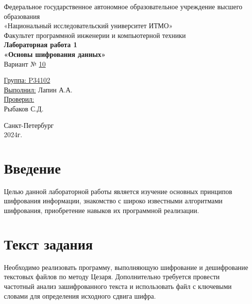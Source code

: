 \documentclass[a4paper, 14pt]{report}
\begin{document}
\begin{titlepage}
    \centering
    {\large Федеральное государственное автономное образовательное учреждение высшего образования}\\
    {\large «Национальный исследовательский университет ИТМО»}\\[0.5cm]

    {\large Факультет программной инженерии и компьютерной техники}\\[3cm]

    {\large \bfseries Лабораторная работа 1}\\[0.5cm]
    {\large \bfseries «Основы шифрования данных»}\\[1cm]

    {\large Вариант № \underline{10}}\\[5cm]
    \begin{flushright}
        {\large \underline{Группа: P34102}}\\[0.5cm]
        {\large \underline{Выполнил:} Лапин А.А.}\\[1cm]

        {\large \underline{Проверил:}}\\
        {\large Рыбаков С.Д.}\\[9cm]
    \end{flushright}

    {\large Санкт-Петербург}\\
    {\large 2024г.}
\end{titlepage}

\tableofcontents
\newpage

\chapter*{Введение}
Целью данной лабораторной работы является изучение основных принципов шифрования информации, знакомство с широко известными алгоритмами шифрования, приобретение навыков их программной реализации.

\chapter{Текст задания}
Необходимо реализовать программу, выполняющую шифрование и дешифрование текстовых файлов по методу Цезаря. Дополнительно требуется провести частотный анализ зашифрованного текста и использовать файл с ключевыми словами для определения исходного сдвига шифра.
\end{document}
